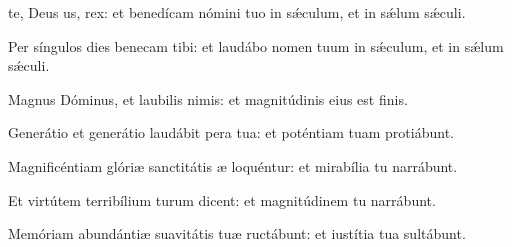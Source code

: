 \item {} te, Deus us, rex:\psstar{} et benedícam nómini tuo in sǽculum, et in sǽlum sǽculi.

\item Per síngulos dies benecam tibi:\psstar{} et laudábo nomen tuum in sǽculum, et in sǽlum sǽculi.

\item Magnus Dóminus, et laubilis nimis:\psstar{} et magnitúdinis eius  est finis.

\item Generátio et generátio laudábit pera tua:\psstar{} et poténtiam tuam protiábunt.

\item Magnificéntiam glóriæ sanctitátis æ loquéntur:\psstar{} et mirabília tu narrábunt.

\item Et virtútem terribílium turum dicent:\psstar{} et magnitúdinem tu narrábunt.

\item Memóriam abundántiæ suavitátis tuæ ructábunt:\psstar{} et iustítia tua sultábunt.

